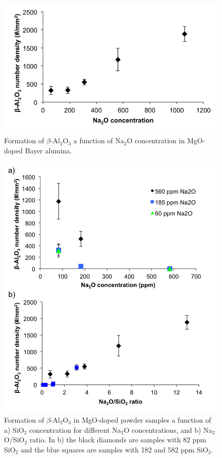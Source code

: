 \newpage
\begin{figure}[H]
	\centering
	\includegraphics[scale=0.84]{Chapter-5/Figures/Figure6.png}
	\caption{Formation of $\beta$-Al$_{2}$O$_{3}$ a function of Na$_{2}$O concentration in MgO-doped Bayer alumina.}
	\label{Ch5-figure:Figure6}
\end{figure}

\newpage
\begin{figure}[H]
	\centering
	\includegraphics{Chapter-5/Figures/Figure7.png}
	\caption{Formation of $\beta$-Al$_{2}$O$_{3}$ in MgO-doped powder samples a function of a) SiO$_{2}$ concentration for different Na$_{2}$O concentrations, and b) Na$_{2}$O/SiO$_{2}$ ratio. In b) the black diamonds are samples with 82 ppm SiO$_{2}$ and the blue squares are samples with 182 and 582 ppm SiO$_{2}$.}
	\label{Ch5-figure:Figure7}
\end{figure}

